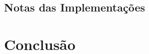 \documentclass[12pt,a4paper,oneside]{article}
\begin{document}
\lipsum[3]

\subsection{Notas das Implementações}

\lipsum[1]

\lipsum[2]


\section{Conclusão}
\label{sec:conc}

\lipsum[1]

\lipsum[2]



\end{document}
